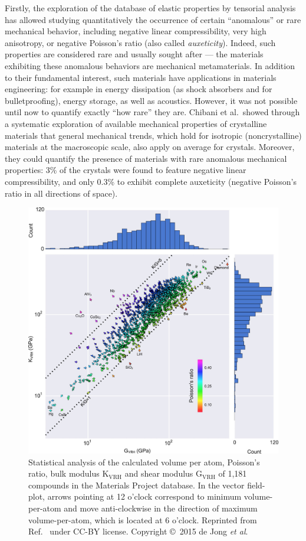 \documentclass[main.tex]{subfiles}
\begin{document}
Firstly, the exploration of the database of elastic properties by tensorial analysis has allowed studying quantitatively the occurrence of certain ``anomalous'' or rare mechanical behavior, including negative linear compressibility, very high anisotropy, or negative Poisson's ratio (also called \emph{auxeticity}). Indeed, such properties are considered rare and usually sought after --- the materials exhibiting these anomalous behaviors are mechanical metamaterials.\autocite{Coudert_2019} In addition to their fundamental interest, such materials have applications in materials engineering: for example in energy dissipation (as shock absorbers and for bulletproofing), energy storage, as well as acoustics.\autocite{Surjadi_2018} However, it was not possible until now to quantify exactly ``how rare'' they are. Chibani et al.\ showed through a systematic exploration of available mechanical properties of crystalline materials that general mechanical trends, which hold for isotropic (noncrystalline) materials at the macroscopic scale, also apply on average for crystals. Moreover, they could quantify the presence of materials with rare anomalous mechanical properties: {3\%} of the crystals were found to feature negative linear compressibility, and only {0.3\%} to exhibit complete auxeticity (negative Poisson's ratio in all directions of space).

\begin{figure}[ht]
\centering
  \includegraphics[width=0.8\linewidth]{figures/1-screening/deJong2015.jpeg}
  \caption{Statistical analysis of the calculated volume per atom, Poisson's ratio, bulk modulus {$\mathrm{K_{VRH}}$} and shear modulus {$\mathrm{G_{VRH}}$ of} 1,181 compounds in the Materials Project database. In the vector field-plot, arrows pointing at 12 o'clock correspond to minimum volume-per-atom and move anti-clockwise in the direction of maximum volume-per-atom, which is located at 6 o'clock. Reprinted from Ref.~\cite{deJong_2015} under CC-BY license. Copyright \copyright\  2015 de Jong \emph{et al}.}\label{fgr:deJong2015}
\end{figure}
\end{document}
